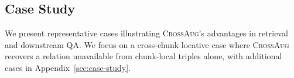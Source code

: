 \documentclass[11pt]{article}
\newcommand{\ours}{\textsc{CrossAug}\xspace}
\begin{document}
\subsection{Case Study}
We present representative cases illustrating \ours{}'s advantages in retrieval and downstream QA. We focus on a cross-chunk locative case where \ours recovers a relation unavailable from chunk-local triples alone, with additional cases in Appendix~\ref{sec:case-study}.
\end{document}
